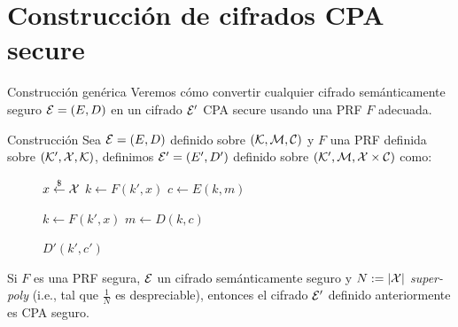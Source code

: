 \section{Construcción de cifrados CPA secure}
\begin{frame}[allowframebreaks]{Construcción genérica}
  Veremos cómo convertir cualquier cifrado semánticamente seguro $\mathcal{E} = (E, D)$ en un cifrado 
  $\mathcal{E}'$ CPA secure usando una PRF $F$ adecuada.
  \begin{block}{Construcción}
    Sea $\mathcal{E} = (E, D)$ definido sobre $(\mathcal{K}, \mathcal{M}, \mathcal{C})$ y $F$ una PRF definida sobre $(\mathcal{K}', \mathcal{X}, \mathcal{K})$,
    definimos $\mathcal{E}' = (E', D')$ definido sobre $(\mathcal{K}', \mathcal{M}, \mathcal{X} \times \mathcal{C})$ como:
    \begin{figure}[h]
      \centering
      \begin{minipage}{0.48\textwidth}
        \begin{algorithm}[H]
          \DontPrintSemicolon
          \footnotesize
          \caption{$E'(k', m)$}
          $x \overset{\$}{\leftarrow} \mathcal{X}$\;
          $k \leftarrow F(k',x)$\;
          $c \leftarrow E(k, m)$\;
        \end{algorithm}
      \end{minipage}
      \hfill
      \begin{minipage}{0.48\textwidth}
        \begin{algorithm}[H]
          \DontPrintSemicolon
          \footnotesize
          \caption{$D'(k', c')$}
          $k \leftarrow F(k', x)$\;
          $m \leftarrow D(k, c)$\;
        \end{algorithm}
      \end{minipage}
    \end{figure}
  \end{block}

  \begin{theorem}
    Si $F$ es una PRF segura, $\mathcal{E}$ un cifrado semánticamente seguro y $N := |\mathcal{X}|$ \textit{super-poly}
    (i.e., tal que $\frac{1}{N}$ es despreciable), entonces el cifrado $\mathcal{E}'$ definido anteriormente 
    es CPA seguro.


\end{theorem}
\end{frame}
